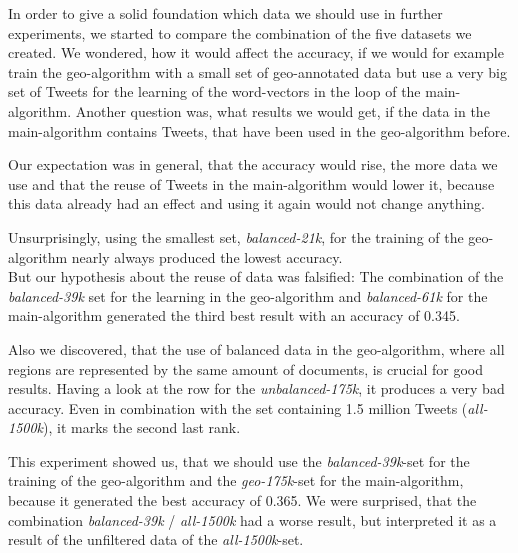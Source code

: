 \documentclass[../Main.tex]{subfiles}
\begin{document}
In order to give a solid foundation which data we should use in further experiments, we started to compare the combination of the five datasets we created. We wondered, how it would affect the accuracy, if we would for example train the geo-algorithm with a small set of geo-annotated data but use a very big set of Tweets for the learning of the word-vectors in the loop of the main-algorithm. Another question was, what results we would get, if the data in the main-algorithm contains Tweets, that have been used in the geo-algorithm before. 

Our expectation was in general, that the accuracy would rise, the more data we use and that the reuse of Tweets in the main-algorithm would lower it, because this data already had an effect and using it again would not change anything.

Unsurprisingly, using the smallest set, \emph{balanced-21k}, for the training of the geo-algorithm nearly always produced the lowest accuracy. \\
But our hypothesis about the reuse of data was falsified:  The combination of the \emph{balanced-39k} set for the learning in the geo-algorithm and \emph{balanced-61k} for the main-algorithm generated the third best result with an accuracy of 0.345.

Also we discovered, that the use of balanced data  in the geo-algorithm, where all regions are represented by the same amount of documents, is crucial for good results. Having a look at the row for the \emph{unbalanced-175k}, it produces a very bad accuracy. Even in combination with the set containing 1.5 million Tweets (\emph{all-1500k}), it marks the second last rank.

This experiment showed us, that we should use the \emph{balanced-39k}-set for the training of the geo-algorithm and the \emph{geo-175k}-set for the main-algorithm, because it generated the best accuracy of 0.365. We were surprised, that the combination \emph{balanced-39k} / \emph{all-1500k} had a worse result, but interpreted it as a result of the unfiltered data of the \emph{all-1500k}-set.
\end{document}
